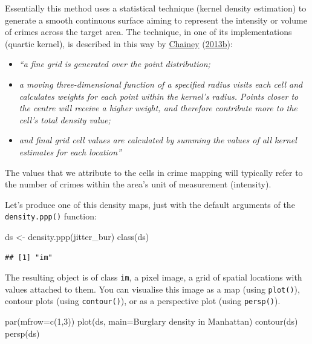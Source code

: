 \documentclass[
  krantz2]{krantz}
\makeatletter
\newenvironment{Shaded}{\begin{snugshade}}{\end{snugshade}}
\newcommand{\AttributeTok}[1]{\textcolor[rgb]{0.61,0.61,0.61}{#1}}
\newcommand{\DecValTok}[1]{\textcolor[rgb]{0.06,0.06,0.06}{#1}}
\newcommand{\FunctionTok}[1]{\textcolor[rgb]{0,0,0}{#1}}
\newcommand{\NormalTok}[1]{#1}
\newcommand{\OtherTok}[1]{\textcolor[rgb]{0.37,0.37,0.37}{#1}}
\newcommand{\StringTok}[1]{\textcolor[rgb]{0.5,0.5,0.5}{#1}}
\providecommand{\tightlist}{%
  \setlength{\itemsep}{0pt}\setlength{\parskip}{0pt}}
\newenvironment{kframe}{%
\medskip{}
\setlength{\fboxsep}{.8em}
 \def\at@end@of@kframe{}%
 \ifinner\ifhmode%
  \def\at@end@of@kframe{\end{minipage}}%
  \begin{minipage}{\columnwidth}%
 \fi\fi%
 \def\FrameCommand##1{\hskip\@totalleftmargin \hskip-\fboxsep
 \colorbox{shadecolor}{##1}\hskip-\fboxsep
     \hskip-\linewidth \hskip-\@totalleftmargin \hskip\columnwidth}%
 \MakeFramed {\advance\hsize-\width
   \@totalleftmargin\z@ \linewidth\hsize
   \@setminipage}}%
 {\par\unskip\endMakeFramed%
 \at@end@of@kframe}
\renewenvironment{Shaded}{\begin{kframe}}{\end{kframe}}
\makeatother
\begin{document}
Essentially this method uses a statistical technique (kernel density estimation) to generate a smooth continuous surface aiming to represent the intensity or volume of crimes across the target area. The technique, in one of its implementations (quartic kernel), is described in this way by \protect\hyperlink{ref-Chainey_2013b}{Chainey} (\protect\hyperlink{ref-Chainey_2013b}{2013b}):

\begin{itemize}
\tightlist
\item
  \emph{``a fine grid is generated over the point distribution;}
\item
  \emph{a moving three-dimensional function of a specified radius visits each cell and calculates weights for each point within the kernel's radius. Points closer to the centre will receive a higher weight, and therefore contribute more to the cell's total density value;}
\item
  \emph{and final grid cell values are calculated by summing the values of all kernel estimates for each location''}
\end{itemize}

The values that we attribute to the cells in crime mapping will typically refer to the number of crimes within the area's unit of measurement (intensity).

Let's produce one of this density maps, just with the default arguments of the \texttt{density.ppp()} function:

\begin{Shaded}
\begin{Highlighting}[]
\NormalTok{ds }\OtherTok{\textless{}{-}} \FunctionTok{density.ppp}\NormalTok{(jitter\_bur)}
\FunctionTok{class}\NormalTok{(ds)}
\end{Highlighting}
\end{Shaded}

\begin{verbatim}
## [1] "im"
\end{verbatim}

The resulting object is of class \texttt{im}, a pixel image, a grid of spatial locations with values attached to them. You can visualise this image as a map (using \texttt{plot()}), contour plots (using \texttt{contour()}), or as a perspective plot (using \texttt{persp()}).

\begin{Shaded}
\begin{Highlighting}[]
\FunctionTok{par}\NormalTok{(}\AttributeTok{mfrow=}\FunctionTok{c}\NormalTok{(}\DecValTok{1}\NormalTok{,}\DecValTok{3}\NormalTok{))}
\FunctionTok{plot}\NormalTok{(ds, }\AttributeTok{main=}\StringTok{\textquotesingle{}Burglary density in Manhattan\textquotesingle{}}\NormalTok{)}
\FunctionTok{contour}\NormalTok{(ds)}
\FunctionTok{persp}\NormalTok{(ds)}
\end{Highlighting}
\end{Shaded}
\end{document}
